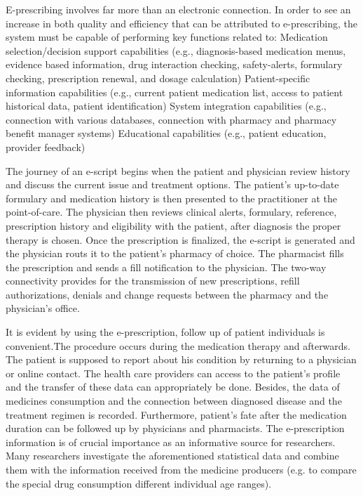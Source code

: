 \documentclass[10pt, conference, compsocconf]{IEEEtran}
\begin{document}
E-prescribing involves far more than an electronic connection. In order to see an increase in both quality and efficiency that can be attributed to e-prescribing, the system must be capable of performing key functions related to:
Medication selection/decision support capabilities (e.g., diagnosis-based medication menus, evidence based information, drug interaction checking, safety-alerts, formulary checking, prescription renewal, and dosage calculation)
Patient-specific information capabilities (e.g., current patient medication list, access to patient historical data, patient identification)
System integration capabilities (e.g., connection with various databases, connection with pharmacy and pharmacy benefit manager systems)
Educational capabilities (e.g., patient education, provider feedback)

The journey of an e-script begins when the patient and physician review history and discuss the current issue and treatment options. The patient’s up-to-date formulary and medication history is then presented to the practitioner at the point-of-care.
The physician then reviews clinical alerts, formulary, reference, prescription history and eligibility with the patient, after diagnosis the proper therapy is chosen.
Once the prescription is finalized, the e-script is generated and the physician routs it to the patient’s pharmacy of choice. The pharmacist fills the prescription and sends a fill notification to the physician.
The two-way connectivity provides for the transmission of new prescriptions, refill authorizations, denials and change requests between the pharmacy and the physician’s office.

It is evident by using the e-prescription, follow up of patient individuals is convenient.The procedure occurs during the medication therapy and afterwards. The patient is supposed to report about his condition by returning to a physician or online contact.
The health care providers can access to the patient's profile and the transfer of these data can appropriately be done.
Besides, the data of medicines consumption and the connection between diagnosed disease and the treatment regimen is recorded.
Furthermore, patient's fate after the medication duration can be followed up by physicians and pharmacists.
The e-prescription information is  of crucial importance as an  informative source for researchers.
Many researchers investigate the aforementioned statistical data and combine them with the information received from the medicine producers (e.g. to compare the special drug consumption different  individual age ranges).
\end{document}
